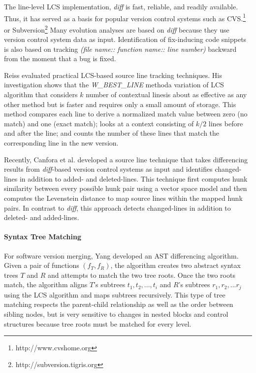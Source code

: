 \documentclass[runningheads,a4paper]{llncs}
\begin{document}
The line-level LCS implementation, \textit{diff} \cite{Hunt1977} is fast, reliable, and readily available. Thus, it has served as a basis for popular version control systems such as CVS.\footnote{http://www.cvshome.org} or Subversion\footnote{http://subversion.tigris.org} Many evolution analyses are based on {\it diff} because they use version control system data as input. Identification of fix-inducing code snippets \cite{Sliwerski2005} is also based on tracking \textit{(file name:: function name:: line number)} backward from the moment that a bug is fixed.  

Reiss \cite{Reiss2008} evaluated practical LCS-based source line tracking techniques. His investigation shows that the {\it W\_BEST\_LINE} method\textemdash  a variation of LCS algorithm that considers $k$ number of contextual lines\textemdash is about as effective as any other method but is faster and requires only a small amount of storage. This method compares each line to derive a normalized match value between zero (no match) and one (exact match); looks at a context consisting of $k/2$ lines before and after the line; and counts the number of these lines that match the corresponding line in the new version.  

Recently, Canfora et al. \cite{Canfora2007} developed a source line technique that takes differencing results from {\it diff}-based version control systems as input and identifies changed-lines in addition to added- and deleted-lines. This technique first computes hunk similarity between every possible hunk pair using a vector space model and then computes the Levenstein distance \cite{Levenstein1966} to map source lines within the mapped hunk pairs. In contrast to {\it diff}, this approach detects changed-lines in addition to deleted- and added-lines. 



\paragraph{Syntax Tree Matching}
For software version merging, Yang \cite{Yang1991} developed an AST differencing algorithm. Given a pair of functions $(f_T,f_R)$, the algorithm creates two abstract syntax trees $T$ and $R$ and attempts to match the two tree roots. Once the two roots match, the algorithm aligns $T$'s subtrees ${t_1, t_2, ..., t_i}$ and $R$'s subtrees ${r_1, r_2, ... r_j}$ using the LCS algorithm and maps subtrees recursively. This type of tree matching respects the parent-child relationship as well as the order between sibling nodes, but is very sensitive to changes in nested blocks and control structures because tree roots must be matched for every level. 
\end{document}
